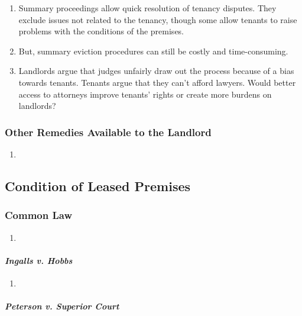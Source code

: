 \begin{enumerate}
    \item Summary proceedings allow quick resolution of tenancy disputes. They 
    exclude issues not related to the tenancy, though some allow tenants to 
    raise problems with the conditions of the premises.
    \item But, summary eviction procedures can still be costly and 
    time-consuming.
    \item Landlords argue that judges unfairly draw out the process because of 
    a bias towards tenants. Tenants argue that they can't afford lawyers. 
    Would better access to attorneys improve tenants' rights or create more 
    burdens on landlords?
\end{enumerate}

\subsubsection{Other Remedies Available to the Landlord} %

\begin{enumerate}
    \item 
\end{enumerate}

\subsection{Condition of Leased Premises} %

\subsubsection{Common Law}

\begin{enumerate} %
    \item
\end{enumerate}

\paragraph{\emph{Ingalls v. Hobbs}} %

\begin{enumerate}
    \item
\end{enumerate}

\paragraph{\emph{Peterson v. Superior Court}} %

